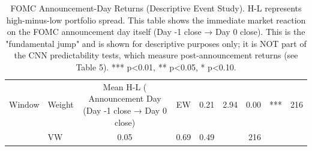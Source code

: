 \begin{table}
\caption{FOMC Announcement-Day Returns (Descriptive Event Study). H-L represents high-minus-low portfolio spread. This table shows the immediate market reaction on the FOMC announcement day itself (Day -1 close → Day 0 close). This is the "fundamental jump" and is shown for descriptive purposes only; it is NOT part of the CNN predictability tests, which measure post-announcement returns (see Table 5). *** p<0.01, ** p<0.05, * p<0.10.}
\label{tab:fomc_announcement_day}
\begin{tabular}{llccccr}
\toprule
Window & Weight & Mean H-L (%
\midrule
Announcement Day
(Day -1 close → Day 0 close) & EW & 0.21 & 2.94 & 0.00 & *** & 216 \\
 & VW & 0.05 & 0.69 & 0.49 &  & 216 \\
\bottomrule
\end{tabular}
\end{table}
